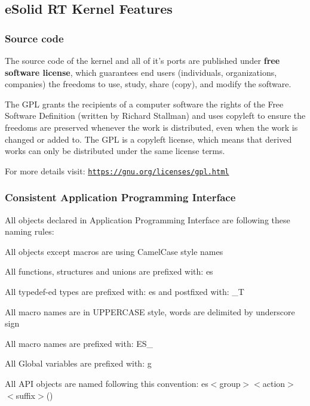 \hypertarget{index_kernel_specs}{}\subsection{e\-Solid R\-T Kernel Features}\label{index_kernel_specs}
\hypertarget{index_spec_source}{}\subsubsection{Source code}\label{index_spec_source}
The source code of the kernel and all of it's ports are published under {\bfseries free software license}, which guarantees end users (individuals, organizations, companies) the freedoms to use, study, share (copy), and modify the software.

The G\-P\-L grants the recipients of a computer software the rights of the Free Software Definition (written by Richard Stallman) and uses copyleft to ensure the freedoms are preserved whenever the work is distributed, even when the work is changed or added to. The G\-P\-L is a copyleft license, which means that derived works can only be distributed under the same license terms.

For more details visit\-: \href{https://gnu.org/licenses/gpl.html}{\tt https\-://gnu.\-org/licenses/gpl.\-html}\hypertarget{index_spec_api}{}\subsubsection{Consistent Application Programming Interface}\label{index_spec_api}
All objects declared in Application Programming Interface are following these naming rules\-:
\begin{DoxyItemize}
\item All objects except macros are using {\ttfamily Camel\-Case} style names
\item All functions, structures and unions are prefixed with\-: {\ttfamily es}
\item All typedef-\/ed types are prefixed with\-: {\ttfamily es} and postfixed with\-: {\ttfamily \-\_\-\-T}
\item All macro names are in {\ttfamily U\-P\-P\-E\-R\-C\-A\-S\-E} style, words are delimited by underscore sign
\item All macro names are prefixed with\-: {\ttfamily E\-S\-\_\-}
\item All Global variables are prefixed with\-: {\ttfamily g}
\end{DoxyItemize}

All A\-P\-I objects are named following this convention\-: {\ttfamily es$<$group$>$$<$action$>$$<$suffix$>$()}


